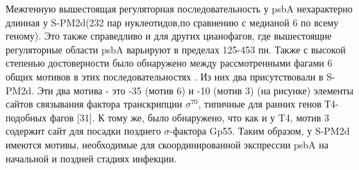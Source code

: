 \documentclass[14pt]{extarticle}
\begin{document}
    \par{Межгенную вышестоящая регуляторная последовательность у psbA нехарактерно длинная у S-PM2d(232 пар 
    нуклеотидов,по сравнению с медианой 6 по всему геному). Это также справедливо и для других цианофагов, где 
    вышестоящие регуляторные области psbA варьируют в пределах 125-453 пн. Также с высокой степенью достоверности  было 
    обнаружено между рассмотренными фагами 6 общих мотивов в этих последовательностях \cite{puxty-evanx}. Из них два 
    присутствовали в S-PM2d. Эти два мотива - это  -35 (мотив 6) и -10 (мотив 3) (на рисунке) элементы сайтов связывания
    фактора транскрипции $\sigma^{70}$, типичные для ранних генов Т4-подобных фагов [31]. К тому же, было обнаружено, 
    что как и у T4, мотив 3 содержит сайт для посадки позднего $\sigma$-фактора Gp55. Таким образом, у S-PM2d имеются 
    мотивы, необходимые для скоординированной экспрессии psbA на начальной и поздней стадиях инфекции.}
    
\end{document}
